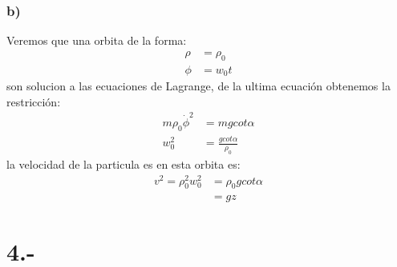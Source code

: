 \documentclass{article}
\begin{document}
\begin{tcolorbox}[breakable]
    \subsubsection*{b)}
    Veremos que una orbita de la forma:
    \begin{align*}
        \rho &= \rho_0 \\
        \phi &= w_0t
    \end{align*}
    son solucion a las ecuaciones de Lagrange, de la ultima ecuación obtenemos la restricción:
    \begin{align*}
        m\rho_0\dot{\phi}^2 &= mgcot\alpha \\
        w_0^2 &= \frac{gcot\alpha}{\rho_0} 
    \end{align*}
    la velocidad de la particula es en esta orbita es: 
    \begin{align*}
        v^2 = \rho_0^2w_0^2 
        &= \rho_0gcot\alpha \\ 
        &= gz
    \end{align*}
\end{tcolorbox}

\section*{4.-}
\end{document}
